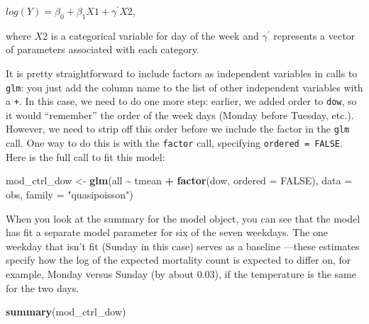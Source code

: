 \documentclass[
]{book}
\newenvironment{Shaded}{\begin{snugshade}}{\end{snugshade}}
\newcommand{\AttributeTok}[1]{\textcolor[rgb]{0.13,0.29,0.53}{#1}}
\newcommand{\ConstantTok}[1]{\textcolor[rgb]{0.56,0.35,0.01}{#1}}
\newcommand{\FunctionTok}[1]{\textcolor[rgb]{0.13,0.29,0.53}{\textbf{#1}}}
\newcommand{\NormalTok}[1]{#1}
\newcommand{\OtherTok}[1]{\textcolor[rgb]{0.56,0.35,0.01}{#1}}
\newcommand{\SpecialCharTok}[1]{\textcolor[rgb]{0.81,0.36,0.00}{\textbf{#1}}}
\newcommand{\StringTok}[1]{\textcolor[rgb]{0.31,0.60,0.02}{#1}}
\begin{document}
\(log(Y)=\beta_{0}+\beta_{1}X1+\gamma^{'}X2\),

where \(X2\) is a categorical variable for day of the week and \(\gamma^{'}\)
represents a vector of parameters associated with each category.

It is pretty straightforward to include factors as independent variables in calls
to \texttt{glm}: you just add the column name to the list of other independent variables
with a \texttt{+}. In this case, we need to do one more step: earlier, we added order to
\texttt{dow}, so it would ``remember'' the order of the week days (Monday before Tuesday,
etc.). However, we need to strip off this order before we include the factor in
the \texttt{glm} call. One way to do this is with the \texttt{factor} call, specifying
\texttt{ordered\ =\ FALSE}. Here is the full call to fit this model:

\begin{Shaded}
\begin{Highlighting}[]
\NormalTok{mod\_ctrl\_dow }\OtherTok{\textless{}{-}} \FunctionTok{glm}\NormalTok{(all }\SpecialCharTok{\textasciitilde{}}\NormalTok{ tmean }\SpecialCharTok{+} \FunctionTok{factor}\NormalTok{(dow, }\AttributeTok{ordered =} \ConstantTok{FALSE}\NormalTok{), }
                    \AttributeTok{data =}\NormalTok{ obs, }\AttributeTok{family =} \StringTok{"quasipoisson"}\NormalTok{)}
\end{Highlighting}
\end{Shaded}

When you look at the summary for the model object, you can see that the
model has fit a separate model parameter for six of the seven weekdays. The one
weekday that isn't fit (Sunday in this case) serves as a baseline ---these
estimates specify how the log of the expected mortality count is expected to
differ on, for example, Monday versus Sunday (by about 0.03), if the temperature
is the same for the two days.

\begin{Shaded}
\begin{Highlighting}[]
\FunctionTok{summary}\NormalTok{(mod\_ctrl\_dow)}
\end{Highlighting}
\end{Shaded}
\end{document}
